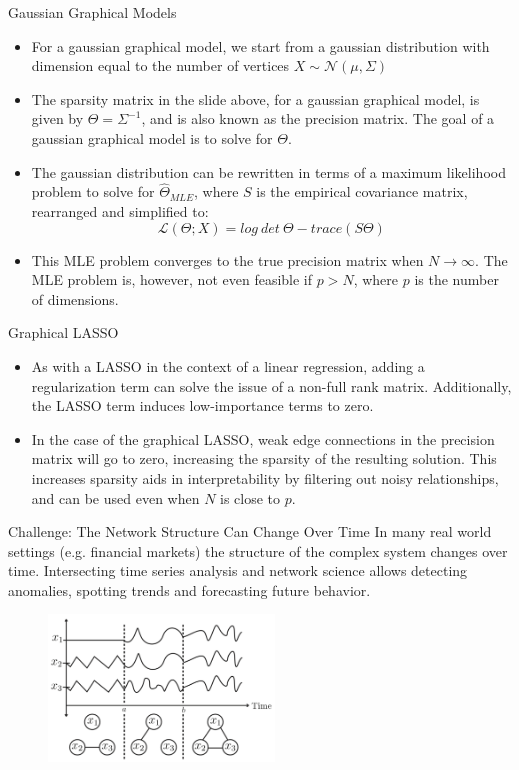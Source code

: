 \documentclass{beamer}
\begin{document}
\begin{frame}{Gaussian Graphical Models}
  \begin{itemize}
    \item For a gaussian graphical model, we start from a gaussian distribution with dimension equal to the number of vertices $X \sim \mathcal{N}(\mu, \Sigma)$
    \item The sparsity matrix in the slide above, for a gaussian graphical model, is given by $\Theta = \Sigma^{-1}$, and is also known as the precision matrix. The goal of a gaussian graphical model is to solve for $\Theta$.
    \item The gaussian distribution can be rewritten in terms of a maximum likelihood problem to solve for $\hat{\Theta}_{MLE}$, where $S$ is the empirical covariance matrix, rearranged and simplified to:
    \[\mathcal{L}(\Theta; X) = log \ det \ \Theta - trace(S \Theta)\]
    \item This MLE problem converges to the true precision matrix when $N \xrightarrow{} \infty$. The MLE problem is, however, not even feasible if $p > N$, where $p$ is the number of dimensions.
  \end{itemize}
\end{frame}

\begin{frame}{Graphical LASSO}
  \begin{itemize}
    \item As with a LASSO in the context of a linear regression, adding a regularization term can solve the issue of a non-full rank matrix. Additionally, the LASSO term induces low-importance terms to zero.
    \item In the case of the graphical LASSO, weak edge connections in the precision matrix will go to zero, increasing the sparsity of the resulting solution. This increases sparsity aids in interpretability by filtering out noisy relationships, and can be used even when $N$ is close to $p$.
  \end{itemize}
\end{frame}

\begin{frame}{Challenge: The Network Structure Can Change Over Time}
    In many real world settings (e.g. financial markets) the structure of the complex system changes over time.
    Intersecting time series analysis and network science allows detecting anomalies, spotting trends and forecasting future behavior.
    \begin{figure}
       \includegraphics[width=6cm]{network_evolution}
       \caption{}
       \label{fig:network_evolution}
  \end{figure}
\end{frame}
\end{document}

